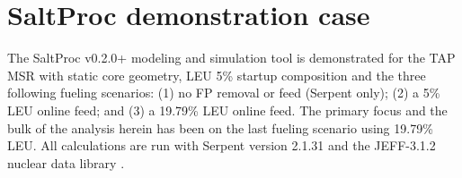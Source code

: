 \documentclass[12pt]{article} %
\begin{document}
\section{SaltProc demonstration case}
The SaltProc v0.2.0+ modeling and simulation tool is demonstrated for the 
\gls{TAP} \gls{MSR} with static core geometry, \gls{LEU} 5\% startup 
composition  \cite{transatomic_power_corporation_neutronics_2016} and the 
three following fueling scenarios: (1) no \gls{FP} removal or feed (Serpent 
only); (2) a 5\% \gls{LEU} online feed; and (3) a 19.79\% \gls{LEU} online 
feed. The primary focus and the bulk of the analysis herein has been on the 
last fueling scenario using 19.79\% \gls{LEU}. All calculations are run with 
Serpent version 2.1.31 and the JEFF-3.1.2 nuclear data library 
\cite{leppanen_serpent_2013, oecd/nea_jeff-3.1.2_2014}.
\end{document}
